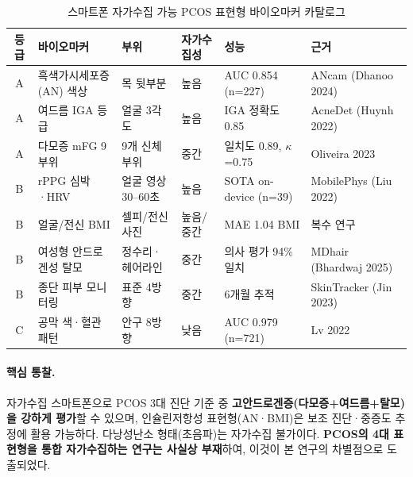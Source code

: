\documentclass[11pt,a4paper]{article}
\begin{document}
\begin{table}[h]
\centering
\footnotesize
\renewcommand{\arraystretch}{1.2}
\caption{스마트폰 자가수집 가능 PCOS 표현형 바이오마커 카탈로그}
\label{tab:catalog}
\begin{tabularx}{\textwidth}{@{}c L p{2.3cm} p{1.6cm} p{3.0cm} p{2.6cm}@{}}
\toprule
\textbf{등급} & \textbf{바이오마커} & \textbf{부위} & \textbf{자가수집성} & \textbf{성능} & \textbf{근거} \\
\midrule
A & 흑색가시세포증(AN) 색상 & 목 뒷부분 & 높음 & AUC 0.854 (n=227) & ANcam (Dhanoo 2024)~\cite{ref5} \\
A & 여드름 IGA 등급 & 얼굴 3각도 & 높음 & IGA 정확도 0.85 & AcneDet (Huynh 2022)~\cite{ref1} \\
A & 다모증 mFG 9부위 & 9개 신체부위 & 중간 & 일치도 0.89, $\kappa$=0.75 & Oliveira 2023~\cite{ref6} \\
B & rPPG 심박·HRV & 얼굴 영상 30{--}60초 & 높음 & SOTA on-device (n=39) & MobilePhys (Liu 2022)~\cite{ref7} \\
B & 얼굴/전신 BMI & 셀피/전신 사진 & 높음/중간 & MAE 1.04 BMI & 복수 연구 \\
B & 여성형 안드로겐성 탈모 & 정수리·헤어라인 & 중간 & 의사 평가 94\% 일치 & MDhair (Bhardwaj 2025)~\cite{ref8} \\
B & 종단 피부 모니터링 & 표준 4방향 & 중간 & 6개월 추적 & SkinTracker (Jin 2023)~\cite{ref9} \\
C & 공막 색·혈관 패턴 & 안구 8방향 & 낮음 & AUC 0.979 (n=721) & Lv 2022~\cite{ref10} \\
\bottomrule
\end{tabularx}
\end{table}

\paragraph{핵심 통찰.} 자가수집 스마트폰으로 PCOS 3대 진단 기준 중 \textbf{고안드로겐증(다모증+여드름+탈모)을 강하게 평가}할 수 있으며, 인슐린저항성 표현형(AN·BMI)은 보조 진단·중증도 추정에 활용 가능하다. 다낭성난소 형태(초음파)는 자가수집 불가이다. \textbf{PCOS의 4대 표현형을 통합 자가수집하는 연구는 사실상 부재}하여, 이것이 본 연구의 차별점으로 도출되었다.
\end{document}
